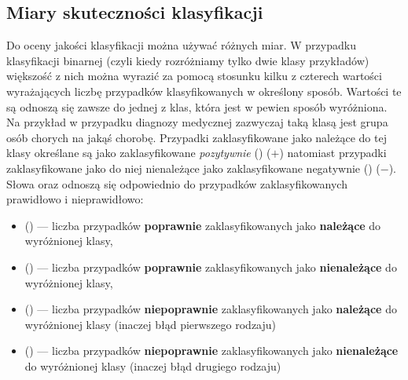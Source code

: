 \subsection{Miary skuteczności klasyfikacji}\label{sec:measures}
	Do oceny jakości klasyfikacji można używać różnych miar. W przypadku klasyfikacji binarnej (czyli kiedy rozróżniamy tylko dwie klasy przykładów) większość z nich można wyrazić za pomocą stosunku kilku z czterech wartości wyrażających liczbę przypadków klasyfikowanych w określony sposób. Wartości te są odnoszą się zawsze do jednej z klas, która jest w pewien sposób wyróżniona. Na przykład w przypadku diagnozy medycznej zazwyczaj taką klasą jest grupa osób chorych na jakąś chorobę. Przypadki zaklasyfikowane jako należące do tej klasy określane są jako zaklasyfikowane \textit{pozytywnie} () ($ + $) natomiast przypadki zaklasyfikowane jako do niej nienależące jako zaklasyfikowane negatywnie () ($ - $). Słowa  oraz  odnoszą się odpowiednio do przypadków zaklasyfikowanych prawidłowo i nieprawidłowo:
	\begin{itemize}
		\item {} () --- liczba przypadków \textbf{poprawnie} zaklasyfikowanych jako \textbf{należące} do wyróżnionej klasy,
		\item  {} () --- liczba przypadków \textbf{poprawnie} zaklasyfikowanych jako \textbf{nienależące} do wyróżnionej klasy,
		\item {} () --- liczba przypadków \textbf{niepoprawnie} zaklasyfikowanych jako \textbf{należące} do wyróżnionej klasy (inaczej błąd pierwszego rodzaju)
		\item {} () --- liczba przypadków \textbf{niepoprawnie} zaklasyfikowanych jako \textbf{nienależące} do wyróżnionej klasy (inaczej błąd drugiego rodzaju)
	\end{itemize}		
	

